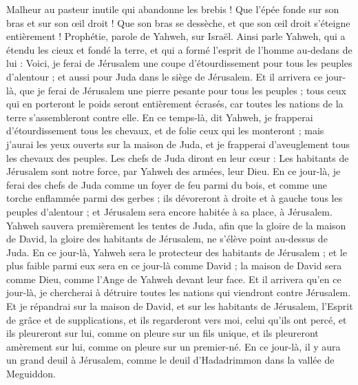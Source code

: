 \begin{multicols}{2}
Malheur au pasteur inutile qui abandonne les brebis ! Que l'épée fonde sur son bras et sur son œil droit ! Que son bras se dessèche, et que son œil droit s'éteigne entièrement !
\VerseOne{}Prophétie, parole de Yahweh, sur Israël. Ainsi parle Yahweh, qui a étendu les cieux et fondé la terre, et qui a formé l'esprit de l'homme au-dedans de lui :
Voici, je ferai de Jérusalem une coupe d'étourdissement pour tous les peuples d'alentour ; et aussi pour Juda dans le siège de Jérusalem.
Et il arrivera ce jour-là, que je ferai de Jérusalem une pierre pesante pour tous les peuples ; tous ceux qui en porteront le poids seront entièrement écrasés, car toutes les nations de la terre s'assembleront contre elle.
En ce temps-là, dit Yahweh, je frapperai d'étourdissement tous les chevaux, et de folie ceux qui les monteront ; mais j'aurai les yeux ouverts sur la maison de Juda, et je frapperai d'aveuglement tous les chevaux des peuples.
Les chefs de Juda diront en leur cœur : Les habitants de Jérusalem sont notre force, par Yahweh des armées, leur Dieu.
En ce jour-là, je ferai des chefs de Juda comme un foyer de feu parmi du bois, et comme une torche enflammée parmi des gerbes ; ils dévoreront à droite et à gauche tous les peuples d'alentour ; et Jérusalem sera encore habitée à sa place, à Jérusalem.
Yahweh sauvera premièrement les tentes de Juda, afin que la gloire de la maison de David, la gloire des habitants de Jérusalem, ne s'élève point au-dessus de Juda.
En ce jour-là, Yahweh sera le protecteur des habitants de Jérusalem ; et le plus faible parmi eux sera en ce jour-là comme David ; la maison de David sera comme Dieu, comme l'Ange de Yahweh devant leur face.
Et il arrivera qu'en ce jour-là, je chercherai à détruire toutes les nations qui viendront contre Jérusalem.
Et je répandrai sur la maison de David, et sur les habitants de Jérusalem, l'Esprit de grâce et de supplications, et ils regarderont vers moi, celui qu'ils ont percé, et ils pleureront sur lui, comme on pleure sur un fils unique, et ils pleureront amèrement sur lui, comme on pleure sur un premier-né.
En ce jour-là, il y aura un grand deuil à Jérusalem, comme le deuil d'Hadadrimmon dans la vallée de Meguiddon.

\end{multicols}
